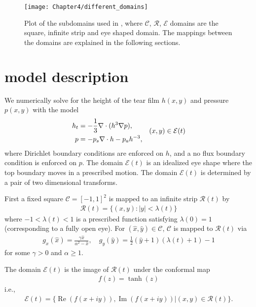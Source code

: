 \begin{figure}
  \centering
  \texttt{[image: Chapter4/different\_domains]}
  \caption{Plot of the subdomains used in \cite{driscoll2018simulation}, where $\mathcal{C}$, $\mathcal{R}$, $\mathcal{E}$ domains are the square, infinite strip and eye shaped domain. The mappings between the domains are explained in the following sections.}
  \label{overature_eye}
\end{figure}
	
\section{model description}

We numerically solve for the height of the tear film $h(x,y)$ and pressure $p(x,y)$ with the model
\begin{align}
\begin{aligned}
h_t &= -\frac{1}{3} \nabla \cdot (h^3 \nabla p), \\
p &= - p_s \nabla \cdot h - p_a h^{-3},
\end{aligned} \quad (x,y) \in \mathcal{E}(t)
\label{the_pde}
\end{align}
where Dirichlet boundary conditions are enforced on $h$, and a no flux boundary condition is enforced on $p$. The domain $\mathcal{E}(t)$ is an idealized eye shape where the top boundary moves in a prescribed motion. The domain $\mathcal{E}(t)$ is determined by a pair of two dimensional transforms.

 
First a fixed square $\mathcal{C}=[-1,1]^2$ is mapped to an infinite strip $\mathcal{R}(t)$ by
\begin{align}
\mathcal{R}(t) = \{(x,y):|y|<\lambda(t)\}	
\end{align}
where $-1<\lambda(t)<1$ is a prescribed function satisfying $\lambda(0)=1$ (corresponding to a fully open eye). For $(\hat{x},\hat{y}) \in \mathcal{C}$, $\mathcal{C}$ is mapped to $\mathcal{R}(t)$ via
\begin{align}
	g_x(\hat{x}) = \frac{\gamma \hat{x}}{\alpha^2 - \hat{x}}, \quad g_y(\hat{y}) = \frac{1}{2} (\hat{y}+1)(\lambda(t)+1)-1
\end{align}
for some $\gamma>0$ and $\alpha \geq 1$.


The domain $\mathcal{E}(t)$ is the image of $\mathcal{R}(t)$ under the conformal map
\begin{align}
f(z) = \tanh(z)	
\end{align}
i.e.,
\begin{align}
\mathcal{E}(t) = \{\operatorname{Re}(f(x+iy)),\operatorname{Im}(f(x+iy))|(x,y) \in \mathcal{R}(t)  \}.
\end{align}

